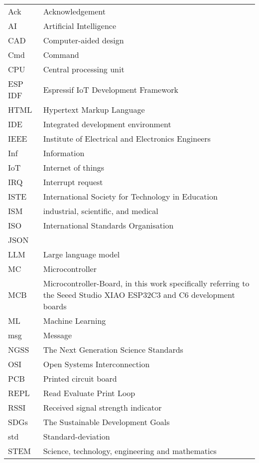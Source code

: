 {\begin{longtable}[h]{@{}p{} @{}p{}@{}}
Ack             & Acknowledgement \\
AI              & Artificial Intelligence \\
CAD				& Computer-aided design \\
Cmd             & Command \\
CPU             & Central processing unit \\
ESP IDF         & Espressif IoT Development Framework \\
HTML            & Hypertext Markup Language \\
IDE             & Integrated development environment \\
IEEE            & Institute of Electrical and Electronics Engineers \\
Inf             & Information \\
IoT             & Internet of things \\
IRQ             & Interrupt request \\
ISTE            & International Society for Technology in Education \\
ISM             & industrial, scientific, and medical \\
ISO             & International Standards Organisation \\
JSON            &  \\
LLM             & Large language model \\
MC              & Microcontroller \\
MCB             & Microcontroller-Board, in this work specifically referring to the Seeed Studio XIAO ESP32C3 and C6 development boards \\
ML              & Machine Learning \\
msg             & Message \\
NGSS            & The Next Generation Science Standards \\
OSI             & Open Systems Interconnection \\
PCB             & Printed circuit board \\
REPL            & Read Evaluate Print Loop \\
RSSI            & Received signal strength indicator \\
SDGs            & The Sustainable Development Goals \\
std             & Standard-deviation \\
STEM            & Science, technology, engineering and mathematics \\

\end{longtable}}
